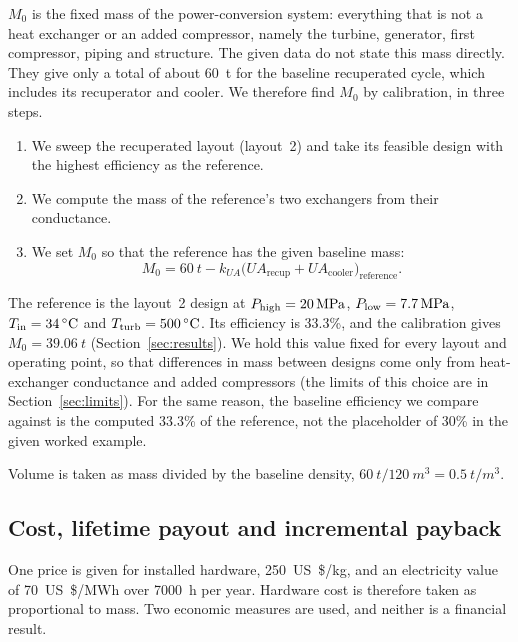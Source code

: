 $M_0$ is the fixed mass of the power-conversion system: everything that is not a heat exchanger or an added compressor, namely the turbine, generator, first compressor, piping and structure. The given data do not state this mass directly. They give only a total of about \SI{60}{t} for the baseline recuperated cycle, which includes its recuperator and cooler. We therefore find $M_0$ by calibration, in three steps.
\begin{enumerate}
  \item We sweep the recuperated layout (layout~2) and take its feasible design with the highest efficiency as the reference.
  \item We compute the mass of the reference's two exchangers from their conductance.
  \item We set $M_0$ so that the reference has the given baseline mass:
  \begin{equation}
  M_0 = \SI{60}{t} - k_{UA}\big(UA_\mathrm{recup} + UA_\mathrm{cooler}\big)_\mathrm{reference}.
  \end{equation}
\end{enumerate}
The reference is the layout~2 design at $P_\mathrm{high} = \SI{20}{MPa}$, $P_\mathrm{low} = \SI{7.7}{MPa}$, $T_\mathrm{in} = \SI{34}{\celsius}$ and $T_\mathrm{turb} = \SI{500}{\celsius}$. Its efficiency is 33.3\%, and the calibration gives $M_0 = \SI{39.06}{t}$ (Section~\ref{sec:results}). We hold this value fixed for every layout and operating point, so that differences in mass between designs come only from heat-exchanger conductance and added compressors (the limits of this choice are in Section~\ref{sec:limits}). For the same reason, the baseline efficiency we compare against is the computed 33.3\% of the reference, not the placeholder of 30\% in the given worked example.

Volume is taken as mass divided by the baseline density, $\SI{60}{t}/\SI{120}{m^3} = \SI{0.5}{t/m^3}$.


\subsection{Cost, lifetime payout and incremental payback}
One price is given for installed hardware, \SI{250}{US\$/kg}, and an electricity value of \SI{70}{US\$/MWh} over \SI{7000}{h} per year. Hardware cost is therefore taken as proportional to mass. Two economic measures are used, and neither is a financial result.

